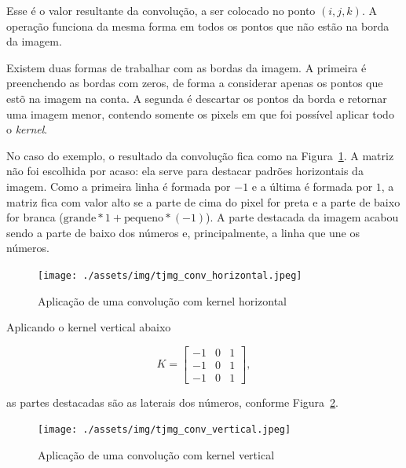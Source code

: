 \documentclass[12pt,twoside,brazilian]{book}
\begin{document}
Esse é o valor resultante da convolução, a ser colocado no ponto
\((i,j,k)\). A operação funciona da mesma forma em todos os pontos que
não estão na borda da imagem.

Existem duas formas de trabalhar com as bordas da imagem. A primeira é
preenchendo as bordas com zeros, de forma a considerar apenas os pontos
que estõ na imagem na conta. A segunda é descartar os pontos da borda e
retornar uma imagem menor, contendo somente os pixels em que foi
possível aplicar todo o \emph{kernel}.

No caso do exemplo, o resultado da convolução fica como na
Figura~\ref{fig-tjmg-exemplo-conv-horizontal}. A matriz não foi
escolhida por acaso: ela serve para destacar padrões horizontais da
imagem. Como a primeira linha é formada por \(-1\) e a última é formada
por \(1\), a matriz fica com valor alto se a parte de cima do pixel for
preta e a parte de baixo for branca
(\(\text{grande} * 1 + \text{pequeno} * (-1)\)). A parte destacada da
imagem acabou sendo a parte de baixo dos números e, principalmente, a
linha que une os números.

\begin{figure}

{\centering \texttt{[image: ./assets/img/tjmg\_conv\_horizontal.jpeg]}

}

\caption{\label{fig-tjmg-exemplo-conv-horizontal}Aplicação de uma
convolução com kernel horizontal}

\end{figure}

Aplicando o kernel vertical abaixo

\[
K = \left[\begin{array}{rrr}-1&0&1\\-1&0&1\\-1&0&1\end{array}\right],
\]

as partes destacadas são as laterais dos números, conforme
Figura~\ref{fig-tjmg-exemplo-conv-vertical}.

\begin{figure}

{\centering \texttt{[image: ./assets/img/tjmg\_conv\_vertical.jpeg]}

}

\caption{\label{fig-tjmg-exemplo-conv-vertical}Aplicação de uma
convolução com kernel vertical}

\end{figure}
\end{document}
